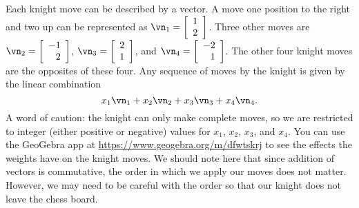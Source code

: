 Each knight move can be described by a vector. A move one position to the right and two up can be represented as $\vn_1 = \left[ \begin{array}{c} 1\\2 \end{array} \right]$. Three other moves are $\vn_2 = \left[ \begin{array}{r} -1\\2 \end{array} \right]$, $\vn_3 = \left[ \begin{array}{c} 2\\1 \end{array} \right]$, and $\vn_4 = \left[ \begin{array}{r} -2\\1 \end{array} \right]$. The other four knight moves are the opposites of these four. Any sequence of moves by the knight is given by the linear combination
\[x_1 \vn_1 + x_2 \vn_2 + x_3 \vn_3 + x_4 \vn_4.\]
A word of caution: the knight can only make complete moves, so we are restricted to integer (either positive or negative) values for $x_1$, $x_2$, $x_3$, and $x_4$. You can use the GeoGebra app at \url{https://www.geogebra.org/m/dfwtskrj} to see the effects the weights have on the knight moves.  We should note here that since addition of vectors is commutative, the order in which we apply our moves does not matter. However, we may need to be careful with the order so that our knight does not leave the chess board. 


